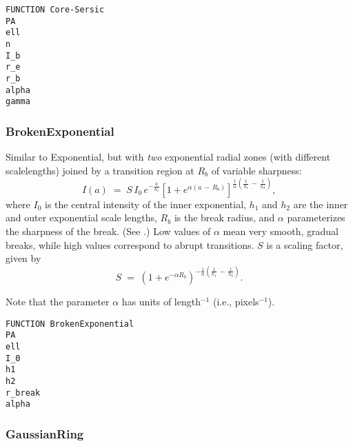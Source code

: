 \documentclass[10pt,a4paper,article]{memoir}
\begin{document}
\begin{verbatim}
FUNCTION Core-Sersic
PA
ell
n
I_b
r_e
r_b
alpha
gamma
\end{verbatim}



%
%


\subsubsection{BrokenExponential}\label{sec:brokenexp}

Similar to Exponential, but with \textit{two}
exponential radial zones (with different scalelengths) joined by a transition region
at $R_{b}$ of variable sharpness:
\begin{equation}
	I(a) \; = \; S \, I_{0} \, e^{-\frac{a}{h_{1}}} [1 + e^{\alpha(a \, - \,
	R_{b})}]^{\frac{1}{\alpha} (\frac{1}{h_{1}} \, - \, \frac{1}{h_{2}})},
\end{equation}
where $I_{0}$ is the central intensity of the inner exponential, $h_{1}$ and
$h_{2}$ are the inner and outer exponential scale lengths, $R_{b}$ is the break radius, and
$\alpha$ parameterizes the sharpness of the break.  (See \citet{erwin08}.) Low values of $\alpha$
mean very smooth, gradual breaks, while high values correspond to abrupt
transitions.  $S$ is a scaling factor, given by
\begin{equation}
  S \; = \; (1 + e^{-\alpha R_{b}})^{-\frac{1}{\alpha} (\frac{1}{h_{1}} \, - 
  \, \frac{1}{h_{2}})}.
\end{equation}

Note that the parameter $\alpha$ has units of length$^{-1}$ (i.e., pixels$^{-1}$).

\begin{verbatim}
FUNCTION BrokenExponential
PA
ell
I_0
h1
h2
r_break
alpha
\end{verbatim}


\subsubsection{GaussianRing}
\end{document}
